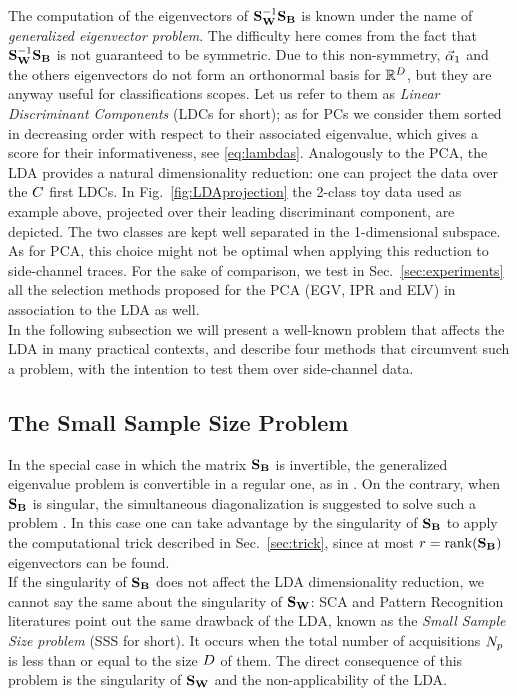 The computation of the eigenvectors of $\textbf{S}_{\textbf{W}}^{-1} \textbf{S}_{\textbf{B}}$ is known under the name of {\em generalized eigenvector problem}. The difficulty here comes from the fact that $\textbf{S}_{\textbf{W}}^{-1} \textbf{S}_{\textbf{B}}$ is not guaranteed to be symmetric. Due to this non-symmetry,  $\vec{\alpha}_1$ and the others eigenvectors do not form an orthonormal basis for $\mathbb{R}^D$, but they are anyway useful for classifications scopes. Let us refer to them as {\em Linear Discriminant Components} (LDCs for short); as for PCs we consider them sorted in decreasing order with respect to their associated eigenvalue, which gives a score for their informativeness, see \eqref{eq:lambdas}. Analogously to the PCA, the LDA provides a natural dimensionality reduction: one can project the data over the $C$ first LDCs. In Fig.~\ref{fig:LDAprojection} the 2-class toy data used as example above, projected over their leading discriminant component, are depicted. The two classes are kept well separated in the 1-dimensional subspace. As for PCA, this choice might not be optimal when applying this reduction to side-channel traces. For the sake of comparison, we test in Sec.~\ref{sec:experiments} all the selection methods proposed for the PCA (EGV, IPR and ELV) in association to the LDA as well.\\

In the following subsection we will present a well-known problem that affects the LDA in many practical contexts, and describe four methods that circumvent such a problem, with the intention to test them over side-channel data.


\subsection{The Small Sample Size Problem}\label{sec:SSS}
In the special case in which the matrix $\textbf{S}_{\textbf{B}}$ is invertible, the generalized eigenvalue problem is convertible in a regular one, as in \cite{Standaert2008}. On the contrary, when $\textbf{S}_{\textbf{B}}$ is singular, the simultaneous diagonalization is suggested to solve such a problem \cite{Fukunaga}. In this case one can take advantage by the singularity of $\textbf{S}_{\textbf{B}}$ to apply the computational trick described in Sec.~\ref{sec:trick}, since at most $r = \mathrm{rank}(\textbf{S}_{\textbf{B}})$ eigenvectors can be found.\\

If the singularity of $\textbf{S}_{\textbf{B}}$ does not affect the LDA dimensionality reduction, we cannot say the same about the singularity of $\textbf{S}_{\textbf{W}}$:  SCA and Pattern Recognition literatures point out the same drawback of the LDA, known as the {\em Small Sample Size problem} (SSS for short). It occurs when the total number of acquisitions $N_p$ is less than or equal to the size $D$ of them.
The direct consequence of this problem is the singularity of $\textbf{S}_{\textbf{W}}$ and the non-applicability of the LDA. \\

